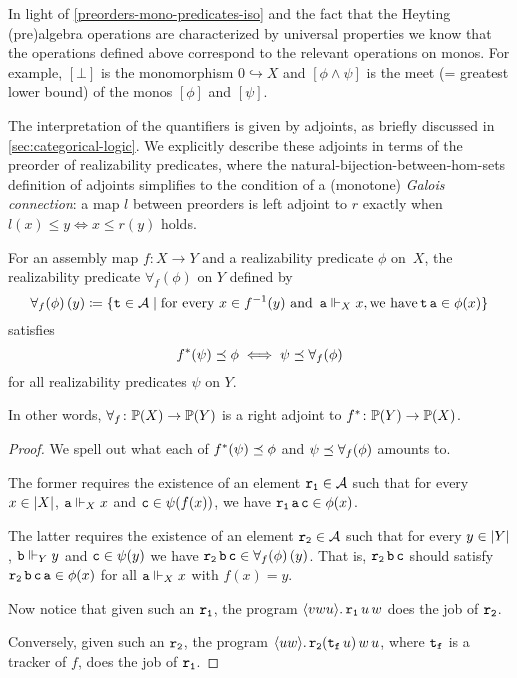 In light of \cref{preorders-mono-predicates-iso} and the fact that the Heyting
(pre)algebra operations are characterized by universal properties we know that
the operations defined above correspond to the relevant operations on monos. For
example, \([\bot]\) is the monomorphism \(0 \hookrightarrow X\) and
\([\phi\land\psi]\) is the meet (= greatest lower bound) of the monos \([\phi]\)
and \([\psi]\).

The interpretation of the quantifiers is given by adjoints, as briefly discussed
in \cref{sec:categorical-logic}. We explicitly describe these adjoints in terms
of the preorder of realizability predicates, where the
natural-bijection-between-hom-sets definition of adjoints simplifies to the
condition of a (monotone) \emph{Galois connection}: a map \(l\) between preorders is
left adjoint to \(r\) exactly when \(l(x) \leq y \iff x \leq r(y)\) holds.

\begin{proposition}
  For an assembly map \(f \colon X \to Y\) and a realizability predicate
  \(\phi\) on~\(X\), the realizability predicate \(\forall_f(\phi)\) on \(Y\)
  defined by
  \[
    {\forall_f(\phi)}\,(y) \coloneqq
    \{\operatorname{\mathtt{t}} \in \mathcal A \mid
      \text{for every } x \in f^{-1}(y) \text{ and } \operatorname{\mathtt{a}} \Vdash_X x, \text{we have}
      \operatorname{\mathtt{t}}\operatorname{\mathtt{a}} \in \phi(x)\}
  \]
  satisfies
  \[
    f^\ast(\psi) \preceq \phi \iff \psi \preceq \forall_f(\phi)
  \]
  for all realizability predicates \(\psi\) on \(Y\).

  In other words, \(\forall_f \colon \mathbb P(X) \to \mathbb P(Y)\) is a right
  adjoint to \(f^\ast \colon \mathbb P(Y) \to \mathbb P(X)\).
\end{proposition}
\begin{proof}
  We spell out what each of \(f^\ast(\psi) \preceq \phi\) and
  \(\psi \preceq \forall_f(\phi)\) amounts to.

  The former requires the existence of an element \(\operatorname{\mathtt{r_1}} \in \mathcal A\) such that
  for every \(x \in \lvert X\rvert\), \(\operatorname{\mathtt{a}} \Vdash_X x\) and
  \(\operatorname{\mathtt{c}} \in \psi(f(x))\), we have \(\operatorname{\mathtt{r_1}}\operatorname{\mathtt{a}}\operatorname{\mathtt{c}} \in \phi(x)\).

  The latter requires the existence of an element \(\operatorname{\mathtt{r_2}} \in \mathcal A\) such
  that for every \(y \in \lvert Y\rvert\), \(\operatorname{\mathtt{b}} \Vdash_Y y\) and
  \(\operatorname{\mathtt{c}} \in \psi(y)\) we have
  \(\operatorname{\mathtt{r_2}}\operatorname{\mathtt{b}}\operatorname{\mathtt{c}} \in \forall_f(\phi)\,(y)\).
  That is, \(\operatorname{\mathtt{r_2}}\operatorname{\mathtt{b}}\operatorname{\mathtt{c}}\) should satisfy
  \(\operatorname{\mathtt{r_2}}\operatorname{\mathtt{b}}\operatorname{\mathtt{c}}\operatorname{\mathtt{a}} \in \phi(x)\) for all
  \(\operatorname{\mathtt{a}} \Vdash_X x\) with \(f(x) = y\).

  Now notice that given such an \(\operatorname{\mathtt{r_1}}\), the program
  \(\langle{{vwu}}\rangle.\,{\operatorname{\mathtt{r_1}}u\,w}\) does the job of \(\operatorname{\mathtt{r_2}}\).

  Conversely, given such an \(\operatorname{\mathtt{r_2}}\), the program
  \(\langle{{uw}}\rangle.\,{\operatorname{\mathtt{r_2}}(\operatorname{\mathtt{t_f}}u)\,w\,u}\), where \(\operatorname{\mathtt{t_f}}\) is a
  tracker of \(f\), does the job of \(\operatorname{\mathtt{r_1}}\).
\end{proof}

